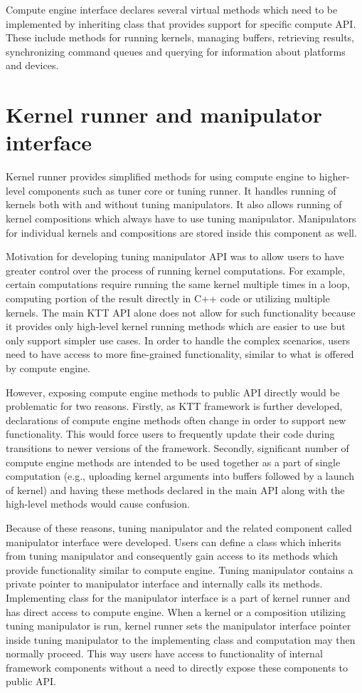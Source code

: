 \documentclass
[
    digital, %
    oneside, %
    table, %
    nolof, %
    nolot, %
    nocover %
]{fithesis3}
\begin{document}
Compute engine interface declares several virtual methods which need to be implemented by inheriting class that provides support for specific compute
API. These include methods for running kernels, managing buffers, retrieving results, synchronizing command queues and querying for information about
platforms and devices.

\section{Kernel runner and manipulator interface}
Kernel runner provides simplified methods for using compute engine to higher-level components such as tuner core or tuning runner. It handles running of
kernels both with and without tuning manipulators. It also allows running of kernel compositions which always have to use tuning manipulator. Manipulators
for individual kernels and compositions are stored inside this component as well.

Motivation for developing tuning manipulator API was to allow users to have greater control over the process of running kernel computations.
For example, certain computations require running the same kernel multiple times in a loop, computing portion of the result directly in C++ code or
utilizing multiple kernels. The main KTT API alone does not allow for such functionality because it provides only high-level kernel running methods which
are easier to use but only support simpler use cases. In order to handle the complex scenarios, users need to have access to more fine-grained
functionality, similar to what is offered by compute engine.

However, exposing compute engine methods to public API directly would be problematic for two reasons. Firstly, as KTT framework is further developed,
declarations of compute engine methods often change in order to support new functionality. This would force users to frequently update their code
during transitions to newer versions of the framework. Secondly, significant number of compute engine methods are intended to be used together as a part
of single computation (e.g., uploading kernel arguments into buffers followed by a launch of kernel) and having these methods declared in the main API
along with the high-level methods would cause confusion.

Because of these reasons, tuning manipulator and the related component called manipulator interface were developed. Users can define a class which
inherits from tuning manipulator and consequently gain access to its methods which provide functionality similar to compute engine. Tuning manipulator
contains a private pointer to manipulator interface and internally calls its methods. Implementing class for the manipulator interface is a part of
kernel runner and has direct access to compute engine. When a kernel or a composition utilizing tuning manipulator is run, kernel runner sets the
manipulator interface pointer inside tuning manipulator to the implementing class and computation may then normally proceed. This way users have access
to functionality of internal framework components without a need to directly expose these components to public API. 
\end{document}
